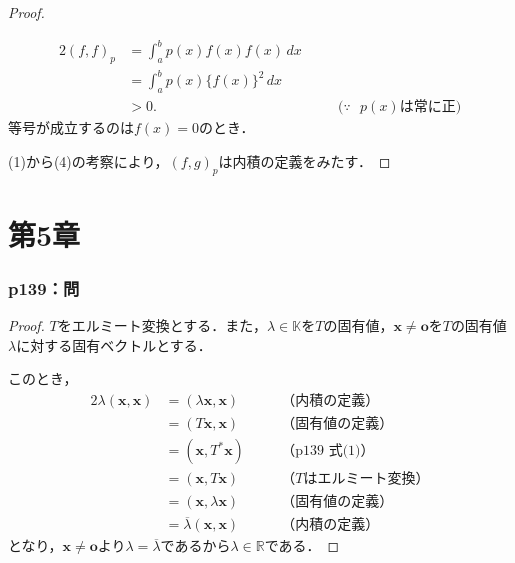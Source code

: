 \documentclass[a4paper,10pt,fleqn]{ltjsarticle}
\begin{document}
\begin{tleftbar}
\begin{proof}
\begin{enumerate}[(1)]
            \begin{alignat*}{2}
              (f,f)_p & = \int_{a}^{b} p(x) f(x) f(x) \, dx   &       &                                 \\
                      & =\int_{a}^{b} p(x) \{ f(x) \}^2 \, dx &       &                                 \\
                      & >0.                                   & \quad & \text{($\because$~ $p(x)$は常に正)}
            \end{alignat*}
            等号が成立するのは$f(x)=0$のとき．
    \end{enumerate}
    (1)から(4)の考察により，$(f,g)_p$は内積の定義をみたす．
  \end{proof}
\end{tleftbar}

\newpage


\part*{第5章}


\section*{p139：問}


\begin{tleftbar}
  \begin{proof}
    $T$をエルミート変換とする．また，$ \lambda \in \mathbb{K}$を$T$の固有値，$\bm{x} \ne \bm{o}$を$T$の固有値$\lambda$に対する固有ベクトルとする．

    このとき，
    \begin{alignat*}{2}
      \lambda (\bm{x},\bm{x}) & = (\lambda \bm{x},\bm{x})            & \quad & \text{（内積の定義）}       \\
                              & = (T \bm{x},\bm{x})                  &       & \text{（固有値の定義）}      \\
                              & = ( \bm{x},T^{\ast} \bm{x})          &       & \text{（p139~式(1)）}   \\
                              & = ( \bm{x},T \bm{x})                 &       & \text{（$T$はエルミート変換）} \\
                              & = (\bm{x},\lambda \bm{x})            &       & \text{（固有値の定義）}      \\
                              & = \overline{\lambda} (\bm{x},\bm{x}) &       & \text{（内積の定義）}
    \end{alignat*}
    となり，$\bm{x} \ne \bm{o}$より$\lambda = \overline{\lambda}$であるから$ \lambda \in \mathbb{R}$である．
  \end{proof}
\end{tleftbar}
\end{document}
